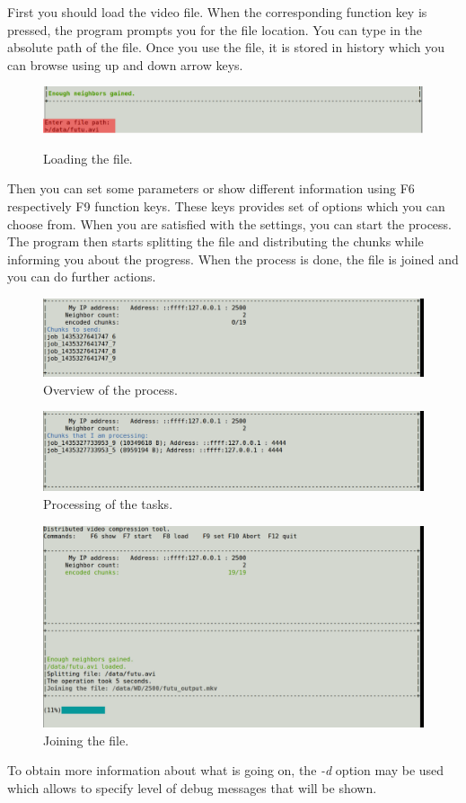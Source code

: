 First you should load the video file. When the corresponding function key is pressed, the program prompts you for the file location. You can type in the absolute path of the file. Once you use the file, it is stored in history which you can browse using up and down arrow keys. 
\begin{figure}[h]
\begin{center}
\includegraphics[scale=0.35]{./img/loading.pdf}
\label{loading-files}
\caption{Loading the file.}
\end{center}
\end{figure}

Then you can set some parameters or show different information using F6 respectively F9 function keys. These keys provides set of options which you can choose from. When you are satisfied with the settings, you can start the process.
The program then starts splitting the file and distributing the chunks while informing you about the progress. When the process is done, the file is joined and you can do further actions.
\begin{figure}[h]
\begin{center}
\includegraphics[scale=0.35]{./img/process-initiator.pdf}
\caption{Overview of the process.}
\end{center}
\end{figure}
\begin{figure}[h]
\begin{center}
\includegraphics[scale=0.35]{./img/processing.pdf}
\caption{Processing of the tasks.}
\end{center}
\end{figure}
\begin{figure}[h]
\begin{center}
\includegraphics[scale=0.35]{./img/joining.pdf}
\caption{Joining the file.}
\end{center}
\end{figure}

To obtain more information about what is going on, the \textit{-d} option may be used which allows to specify level of debug messages that will be shown.